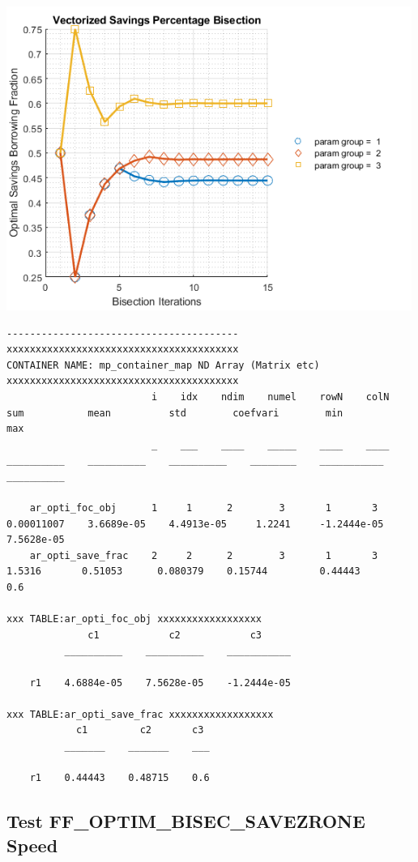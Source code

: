 \documentclass[
]{book}
\begin{document}
\includegraphics[width=5.20833in,height=\textheight]{img/fx_optim_bisec_savezrone_images/figure_2.png}

\begin{verbatim}
----------------------------------------
xxxxxxxxxxxxxxxxxxxxxxxxxxxxxxxxxxxxxxxx
CONTAINER NAME: mp_container_map ND Array (Matrix etc)
xxxxxxxxxxxxxxxxxxxxxxxxxxxxxxxxxxxxxxxx
                         i    idx    ndim    numel    rowN    colN       sum           mean          std        coefvari        min           max    
                         _    ___    ____    _____    ____    ____    __________    __________    __________    ________    ___________    __________

    ar_opti_foc_obj      1     1      2        3       1       3      0.00011007    3.6689e-05    4.4913e-05     1.2241     -1.2444e-05    7.5628e-05
    ar_opti_save_frac    2     2      2        3       1       3          1.5316       0.51053      0.080379    0.15744         0.44443           0.6

xxx TABLE:ar_opti_foc_obj xxxxxxxxxxxxxxxxxx
              c1            c2            c3     
          __________    __________    ___________

    r1    4.6884e-05    7.5628e-05    -1.2444e-05

xxx TABLE:ar_opti_save_frac xxxxxxxxxxxxxxxxxx
            c1         c2       c3 
          _______    _______    ___

    r1    0.44443    0.48715    0.6
\end{verbatim}

\hypertarget{test-ff_optim_bisec_savezrone-speed}{%
\subsection{Test FF\_OPTIM\_BISEC\_SAVEZRONE Speed}\label{test-ff_optim_bisec_savezrone-speed}}
\end{document}
